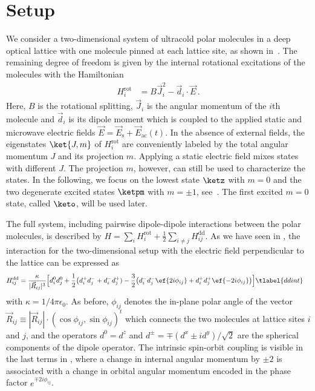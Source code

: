 \section{Setup}


We consider a two-dimensional system of ultracold polar molecules in a deep optical lattice with one molecule pinned at each lattice site, as shown in~.
The remaining degree of freedom is given by the internal rotational excitations of the molecules with the Hamiltonian
\begin{align}
    H^{\text{rot}}_i &= B \vec{J}_i^2 - \vec{d}_i\cdot\vec{E}\,.
\end{align}
Here, $B$ is the rotational splitting, $\vec{J}_i$ is the angular momentum of the $i$th molecule and $\vec{d}_i$ is its dipole moment which is coupled to the applied static and microwave electric fields $\vec{E} = \vec{E}_{\text{s}} + \vec{E}_{\text{ac}}(t)$.
In the absence of external fields, the eigenstates $\ket{J,m}$ of $H^{\text{rot}}_{i}$ are conveniently labeled by the total angular momentum $J$ and its projection $m$.
Applying a static electric field mixes states with different $J$.
The projection $m$, however, can still be used to characterize the states.
In the following, we focus on the lowest state $\ketz$ with $m=0$ and the two degenerate excited states $\ketpm$ with $m = \pm 1$, see~.
The first excited $m=0$ state, called $\keto$, will be used later.

The full system, including pairwise dipole-dipole interactions between the polar mole\-cules, is described by $H=\sum_i H^{\text{rot}}_i + \frac{1}{2}\sum_{i\ne j}H^{\text{dd}}_{ij}$.
As we have seen in , the interaction for the two-dimensional setup with the electric field perpendicular to the lattice can be expressed as
\begin{align}
    H^{\text{dd}}_{ij}=\frac{\kappa}{|\vec{R}_{ij}|^3} &\Big[d^0_i d^0_j + \frac{1}{2}\big(d^+_i d^-_j + d^-_i d^+_j) - \frac{3}{2}\big(d^-_i d^-_j \ef{2i\phi_{ij}} + d^+_i d^+_j \ef{-2i\phi_{ij}}\big)\Big] \tlabel{ddint}
\end{align}
with $\kappa=1/4\pi\epsilon_0$.
As before, $\phi_{ij}$ denotes the in-plane polar angle of the vector $\vec{R}_{ij} \equiv |\vec{R}_{ij}| \cdot (\cos \phi_{ij}, \sin \phi_{ij})^t$ which connects the two molecules at lattice sites $i$ and $j$, and the operators $d^0=d^z$ and $d^\pm=\mp (d^x\pm i d^y)/\sqrt{2}$ are the spherical components of the dipole operator.
The intrinsic spin-orbit coupling is visible in the last terms in , where a change in internal angular momentum by $\pm 2$ is associated with a change in orbital angular momentum encoded in the phase factor $e^{\mp 2i \phi_{ij}}$.

